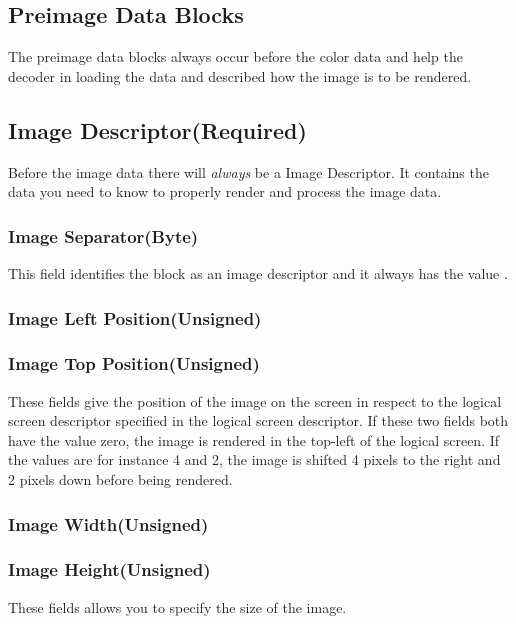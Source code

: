 \begin{refsection}
  \section{Preimage Data Blocks}

  The preimage data blocks always occur before the color data and help
  the decoder in loading the data and described how the image is to be
  rendered.

  \subsection{Image Descriptor(Required)}

  Before the image data there will \textit{always} be a Image
  Descriptor. It contains the data you need to know to properly render
  and process the image data.

  \subsubsection{Image Separator(Byte)}

  This field identifies the block as an image descriptor and it always
  has the value .

  \subsubsection{Image Left Position(Unsigned)}
  \subsubsection{Image Top Position(Unsigned)}

  These fields give the position of the image on the screen in respect
  to the logical screen descriptor specified in the logical screen
  descriptor. If these two fields both have the value zero, the image
  is rendered in the top-left of the logical screen. If the values are
  for instance 4 and 2, the image is shifted 4 pixels to the right and
  2 pixels down before being rendered.

  \subsubsection{Image Width(Unsigned)}
  \subsubsection{Image Height(Unsigned)}

  These fields allows you to specify the size of the image.


\end{refsection}
